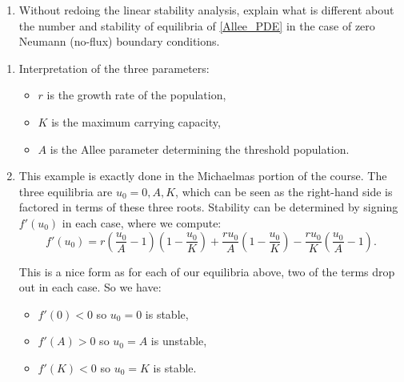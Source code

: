 \documentclass[a4paper,12pt]{article}
\begin{document}
\begin{enumerate}
{\begin{enumerate}[label=(\alph*)]
            \item Without redoing the linear stability analysis,
            explain what is different about the number and stability
            of equilibria of \cref{Allee_PDE} in the case of zero
            Neumann (no-flux) boundary conditions.
        \end{enumerate}
    }
    { %
        \begin{enumerate}[label=(\alph*)]
            \item Interpretation of the three parameters:
            \begin{itemize}
                \item $r$ is the growth rate of the population,
                \item $K$ is the maximum carrying capacity,
                \item $A$ is the Allee parameter determining the
                threshold population.
            \end{itemize}

            \item This example is exactly done in the Michaelmas
            portion of the course. The three equilibria are
            $u_0=0, A, K$, which can be seen as the right-hand side
            is factored in terms of these three roots. Stability can
            be determined by signing $f'(u_0)$ in each case, where
            we compute:
            \begin{equation}
                f'(u_0) =
                r\left(\frac{u_0}{A}-1\right)
                \left(1-\frac{u_0}{K}\right)
                + \frac{ru_0}{A}\left(1-\frac{u_0}{K}\right)
                - \frac{ru_0}{K}
                \left(\frac{u_0}{A}-1\right).
            \end{equation}

            This is a nice form as for each of our equilibria above,
            two of the terms drop out in each case. So we have:
            \begin{itemize}
                \item $f'(0)<0$ so $u_0=0$ is stable,
                \item $f'(A)>0$ so $u_0=A$ is unstable,
                \item $f'(K)<0$ so $u_0=K$ is stable.
            \end{itemize}


\end{enumerate}}
\end{enumerate}
\end{document}
